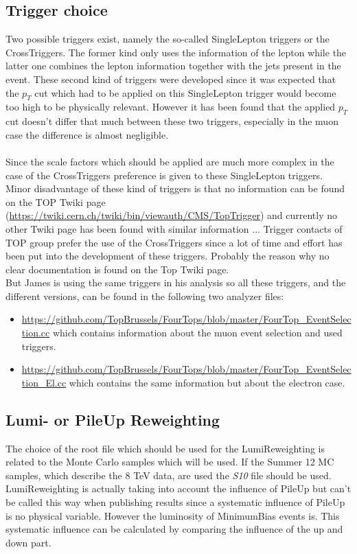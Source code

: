 \documentclass[a4paper,12pt]{report}
\begin{document}
\subsection{Trigger choice}
Two possible triggers exist, namely the so-called SingleLepton triggers or the CrossTriggers. The former kind only uses the information of the lepton while the latter one combines the lepton information together with the jets present in the event. These second kind of triggers were developed since it was expected that the $p_T$ cut which had to be applied on this SingleLepton trigger would become too high to be physically relevant. However it has been found that the applied $p_T$ cut doesn't differ that much between these two triggers, especially in the muon case the difference is almost negligible.\\
\\
Since the scale factors which should be applied are much more complex in the case of the CrossTriggers preference is given to these SingleLepton triggers.\\
Minor disadvantage of these kind of triggers is that no information can be found on the TOP Twiki page (\url{https://twiki.cern.ch/twiki/bin/viewauth/CMS/TopTrigger}) and currently no other Twiki page has been found with similar information ... Trigger contacts of TOP group prefer the use of the CrossTriggers since a lot of time and effort has been put into the development of these triggers. Probably the reason why no clear documentation is found on the Top Twiki page.\\
But James is using the same triggers in his analysis so all these triggers, and the different versions, can be found in the following two analyzer files:
\begin{itemize}
 \item \url{https://github.com/TopBrussels/FourTops/blob/master/FourTop_EventSelection.cc} which contains information about the muon event selection and used triggers.
 \item \url{https://github.com/TopBrussels/FourTops/blob/master/FourTop_EventSelection_El.cc} which contains the same information but about the electron case.
\end{itemize}

\subsection{Lumi- or PileUp Reweighting}
The choice of the root file which should be used for the LumiReweighting is related to the Monte Carlo samples which will be used. If the Summer 12 MC samples, which describe the 8 TeV data, are used the \textit{S10} file should be used.\\
LumiReweighting is actually taking into account the influence of PileUp but can't be called this way when publishing results since a systematic influence of PileUp is no physical variable. However the luminosity of MinimumBias events is. This systematic influence can be calculated by comparing the influence of the up and down part.
\end{document}

